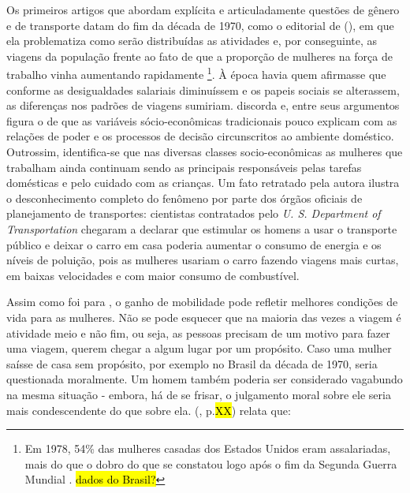Os primeiros artigos que abordam explícita e articuladamente questões de gênero e de transporte datam do fim da década de 1970, como o editorial de  (\citeyear{ROSENBLOOM1978}), em que ela problematiza como serão distribuídas as atividades e, por conseguinte, as viagens da população frente ao fato de que a proporção de mulheres na força de trabalho vinha aumentando rapidamente
\footnote{Em 1978, 54\% das mulheres casadas dos Estados Unidos eram assalariadas, mais do que o dobro do que se constatou logo após o fim da Segunda Guerra Mundial \cite{ROSENBLOOM1978}.
\hl{dados do Brasil?}}. À época havia quem afirmasse que conforme as desigualdades salariais diminuíssem e os papeis sociais se alterassem, as diferenças nos padrões de viagens sumiriam.  discorda e, entre seus argumentos figura o de que as variáveis sócio-econômicas tradicionais pouco explicam com as relações de poder e os processos de decisão circunscritos ao ambiente doméstico. Outrossim, identifica-se que nas diversas classes socio-econômicas as mulheres que trabalham ainda continuam sendo as principais responsáveis pelas tarefas domésticas e pelo cuidado com as crianças. Um fato retratado pela autora ilustra o desconhecimento completo do fenômeno por parte dos órgãos oficiais de planejamento de transportes: cientistas contratados pelo \emph{U. S. Department of Transportation} chegaram a declarar que estimular os homens a usar o transporte público e  deixar o carro em casa poderia aumentar o consumo de energia e os níveis de poluição, pois as mulheres usariam o carro fazendo viagens mais curtas, em baixas velocidades e com maior consumo de combustível.


Assim como foi para , o ganho de mobilidade pode refletir melhores condições de vida para as mulheres. Não se pode esquecer que na maioria das vezes a viagem é atividade meio e não fim, ou seja, as pessoas precisam de um motivo para fazer uma viagem, querem chegar a algum lugar por um propósito. Caso uma mulher saísse de casa sem propósito, por exemplo no Brasil da década de 1970, seria questionada moralmente. Um homem também poderia ser considerado vagabundo na mesma situação - embora, há de se frisar, o julgamento moral sobre ele seria mais condescendente do que sobre ela.  (\citeyear{DINCAO2012}, p.\hl{XX}) relata que: 

